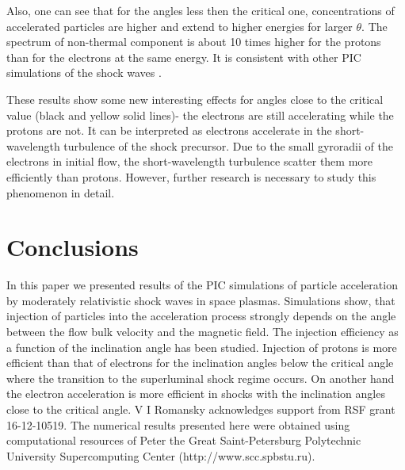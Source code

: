 \documentclass[a4paper]{jpconf}
\begin{document}
Also, one can see that for the angles less then the critical one, concentrations of accelerated particles are higher and extend to higher energies for larger $\theta$. The spectrum of non-thermal component is about 10 times higher for the protons than for the electrons at the same energy. It is consistent with other PIC simulations of the shock waves {\cite{Sironi2011}}.

These results show some new interesting effects for angles close to the critical value (black and yellow solid lines)- the electrons are still accelerating while the protons are not. It can be interpreted as electrons accelerate in the short-wavelength turbulence of the shock precursor. Due to the small gyroradii of the electrons in initial flow, the short-wavelength turbulence scatter them more efficiently than protons. However, further research is necessary to study this phenomenon in detail.


\section{Conclusions}
In this paper we presented results of the PIC simulations of particle acceleration by moderately relativistic shock waves in space plasmas. Simulations show, that injection of particles into the acceleration process strongly depends on the angle between the flow bulk velocity and the magnetic field. The injection efficiency as a function of the inclination angle has been studied. Injection of protons is more efficient than that of electrons for the inclination angles below the critical angle where the transition to the superluminal shock regime occurs. On  another hand the electron acceleration is more efficient in shocks with the inclination angles close to the critical angle.
\ack
V I Romansky acknowledges support from RSF grant 16-12-10519.
The numerical results presented here were obtained using computational resources of Peter the Great Saint-Petersburg Polytechnic University Supercomputing Center (http://www.scc.spbstu.ru). 
\end{document}
